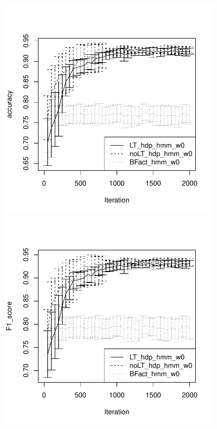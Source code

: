 \begin{figure}[tb]
  \centering
  \begin{minipage}{0.40\textwidth}
  \includegraphics[width =
  \textwidth]{fig/synth16/w0/noLT_s0/accuracy.pdf}
\end{minipage}
\hspace{0.1in}
  \begin{minipage}{0.40\textwidth}
\includegraphics[width = \textwidth]{fig/synth16/w0/noLT_s0/F1_score.pdf}
\end{minipage}


\end{figure}
